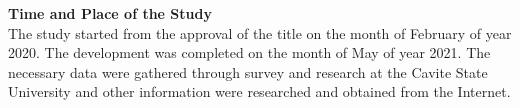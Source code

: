 \flushleft
\textbf{Time and Place of the Study}\\
\justifying
\parx
The study started from the approval of the title on the month of February of year
2020. The development was completed on the month of May of year
2021. The necessary data were gathered through survey and research at the Cavite
State University and other information were researched and obtained from the
Internet.\\
